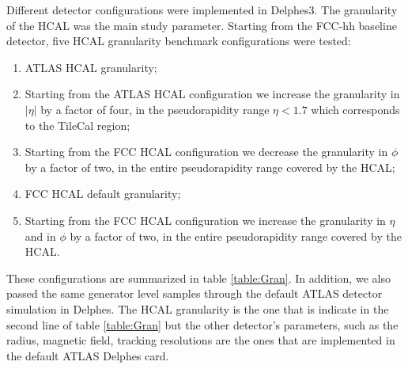 Different detector configurations were implemented in Delphes3. The granularity of the HCAL was the main study parameter. Starting from the FCC-hh baseline detector, five HCAL granularity benchmark configurations were tested:
\begin{enumerate}
	\item ATLAS HCAL granularity;
	\item Starting from the ATLAS HCAL configuration we increase the granularity in $|\eta|$ by a factor of four, in the pseudorapidity range $\eta < 1.7$ which corresponds to the TileCal region;
	\item Starting from the FCC HCAL configuration we decrease the granularity in $\phi$ by a factor of two, in the entire pseudorapidity range covered by the HCAL;
	\item FCC HCAL default granularity;
	\item Starting from the FCC HCAL configuration we increase the granularity in $\eta$ and in $\phi$ by a factor of two, in the entire pseudorapidity range covered by the HCAL.
\end{enumerate}
These configurations are summarized in table \ref{table:Gran}. In addition, we also passed the same generator level samples through the default ATLAS detector simulation in Delphes. The HCAL granularity is the one that is indicate in the second line of table \ref{table:Gran} but the other detector’s parameters, such as the radius, magnetic field, tracking resolutions are the ones that are implemented in the default ATLAS Delphes card.

